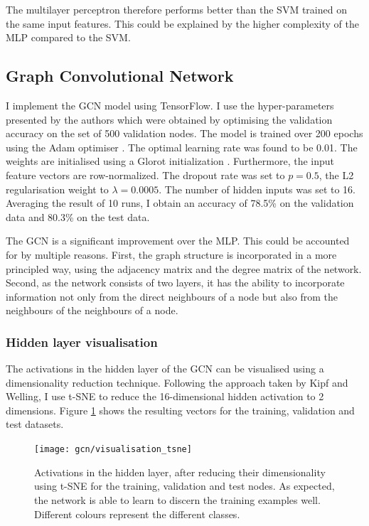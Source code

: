 \documentclass[12pt]{article}
\theoremstyle{definition}
\begin{document}
\bigskip

The multilayer perceptron therefore performs better than the SVM trained on the same input features. This could be explained by the higher complexity of the MLP compared to the SVM.

\subsection{Graph Convolutional Network}

I implement the GCN model using TensorFlow. I use the hyper-parameters presented by the authors which were obtained by optimising the validation accuracy on the set of 500 validation nodes. The model is trained over 200 epochs using the Adam optimiser \cite{kingma2014adam}. The optimal learning rate was found to be 0.01. The weights are initialised using a Glorot initialization \cite{glorot2010understanding}. Furthermore, the input feature vectors are row-normalized. The dropout rate was set to $p=0.5$, the L2 regularisation weight to $\lambda=0.0005$. The number of hidden inputs was set to 16. Averaging the result of 10 runs, I obtain an accuracy of 78.5\% on the validation data and 80.3\% on the test data.

\bigskip

The GCN is a significant improvement over the MLP. This could be accounted for by multiple reasons. First, the graph structure is incorporated in a more principled way, using the adjacency matrix and the degree matrix of the network. Second, as the network consists of two layers, it has the ability to incorporate information not only from the direct neighbours of a node but also from the neighbours of the neighbours of a node.

\subsubsection{Hidden layer visualisation}

The activations in the hidden layer of the GCN can be visualised using a dimensionality reduction technique. Following the approach taken by Kipf and Welling, I use t-SNE \cite{maaten2008visualizing} to reduce the 16-dimensional hidden activation to 2 dimensions. Figure \ref{fig/gcn_tsne} shows the resulting vectors for the training, validation and test datasets.

\begin{figure}[h]
	\texttt{[image: gcn/visualisation\_tsne]}
	\centering
	\caption{Activations in the hidden layer, after reducing their dimensionality using t-SNE for the training, validation and test nodes. As expected, the network is able to learn to discern the training examples well. Different colours represent the different classes.}
	\label{fig/gcn_tsne}
\end{figure}
\end{document}
